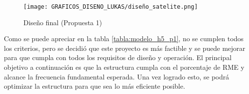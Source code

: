 \begin{figure}[H]
    \centering
    \texttt{[image: GRAFICOS\_DISENO\_LUKAS/diseño\_satelite.png]}
    \caption{Diseño final (Propuesta 1)}
    \label{fig:propuesta1}
\end{figure}

Como se puede apreciar en la tabla \ref{tabla:modelo_h5_p1}, no se cumplen todos los criterios, pero se decidió que este proyecto es más factible y se puede mejorar para que cumpla con todos los requisitos de diseño y operación. El principal objetivo a continuación es que la estructura cumpla con el porcentaje de RME y alcance la frecuencia fundamental esperada. Una vez logrado esto, se podrá optimizar la estructura para que sea lo más eficiente posible.
